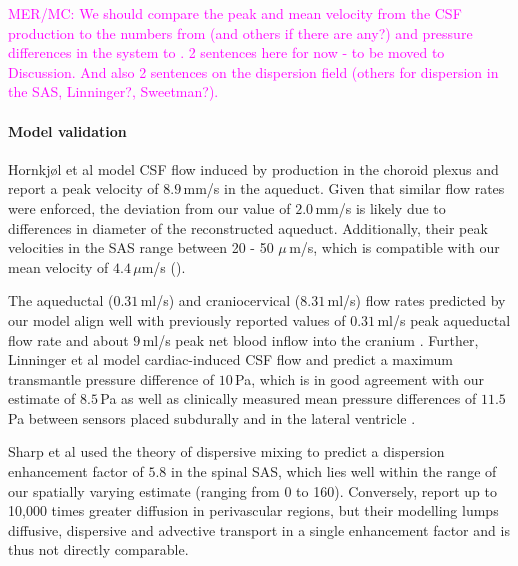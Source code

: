 \documentclass[fleqn,10pt]{wlscirep}
\newcommand{\mer}[1]{\textcolor{magenta}{#1}}
\begin{document}
\mer{MER/MC: We should compare the peak and mean velocity from the CSF production to the numbers from \cite{hornkjol2022csf} (and others if there are any?) and pressure differences in the system to \cite{vinje2019respiratory}. 2 sentences here for now - to be moved to Discussion. And also 2 sentences on the dispersion field \cite{asgari2016glymphatic, keith2019dispersion, hornkjol2022csf, ray2021quantitative} (others for dispersion in the SAS, Linninger?, Sweetman?).}

\paragraph{Model validation}


Hornkjøl et al \cite{hornkjol2022csf} model CSF flow induced by production in the choroid plexus and report a peak velocity of $8.9\,$mm/s in the aqueduct. Given that similar flow rates were enforced, the deviation from our value of $2.0\,$mm/s is likely due to differences in diameter of the reconstructed aqueduct. Additionally, their peak velocities in the SAS range between 20 - 50 $\mu\,$m/s, which is compatible with our mean velocity of $4.4\,\mu$m/s ().

The aqueductal ($0.31\,$ml/s) and craniocervical ($8.31\,$ml/s) flow rates predicted by our model align well with previously reported values of $0.31\,$ml/s peak aqueductal flow rate \cite{vinje2019respiratory} and about $9\,$ml/s peak net blood inflow into the cranium \cite{baledent2014imaging}. Further, Linninger et al \cite{linninger2007cerebrospinal} model cardiac-induced CSF flow and predict a maximum transmantle pressure difference of $10\,$Pa, which is in good agreement with our estimate of $8.5\,$Pa as well as clinically measured mean pressure differences of $11.5\,$Pa between sensors placed subdurally and in the lateral ventricle \cite{vinje2019respiratory}.

Sharp et al used the theory of dispersive mixing to predict a dispersion enhancement factor of $5.8$ in the spinal SAS, which lies well within the range of our spatially varying estimate (ranging from 0 to 160). Conversely, \cite{ray2021quantitative} report up to 10,000 times greater diffusion in perivascular regions, but their modelling lumps diffusive, dispersive and advective transport in a single enhancement factor and is thus not directly comparable.
\end{document}
